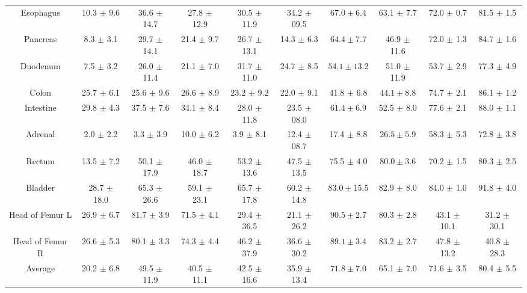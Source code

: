 \begin{table}[t!]
{\begin{subtable}{1\textwidth}
{\begin{tabular}{cccccccccc}
Esophagus&10.3 $\pm$ 9.6&36.6 $\pm$ 14.7&27.8 $\pm$ 12.9&30.5 $\pm$ 11.9&34.2 $\pm$ 09.5&$\bm{67.0\pm6.4}$&63.1 $\pm$ 7.7&72.0 $\pm$ 0.7&81.5 $\pm$ 1.5\\
Pancreas&8.3 $\pm$ 3.1&29.7 $\pm$ 14.1&21.4 $\pm$ 9.7&26.7 $\pm$ 13.1&14.3 $\pm$ 6.3&$\bm{64.4\pm7.7}$&46.9 $\pm$ 11.6&72.0 $\pm$ 1.3&84.7 $\pm$ 1.6\\
Duodenum&7.5 $\pm$ 3.2&26.0 $\pm$ 11.4&21.1 $\pm$ 7.0&31.7 $\pm$ 11.0&24.7 $\pm$ 8.5&$\bm{54.1\pm13.2}$&51.0 $\pm$ 11.9&53.7 $\pm$ 2.9&77.3 $\pm$ 4.9\\
Colon&25.7 $\pm$ 6.1&25.6 $\pm$ 9.6&26.6 $\pm$ 8.9&23.2 $\pm$ 9.2&22.0 $\pm$ 9.1&41.8 $\pm$ 6.8&$\bm{44.1\pm8.8}$&74.7 $\pm$ 2.1&86.1 $\pm$ 1.2\\
Intestine&29.8 $\pm$ 4.3&37.5 $\pm$ 7.6&34.1 $\pm$ 8.4&28.0 $\pm$ 11.8&23.5 $\pm$ 08.0&$\bm{61.4\pm6.9}$&52.5 $\pm$ 8.0&77.6 $\pm$ 2.1&88.0 $\pm$ 1.1\\
Adrenal&2.0 $\pm$ 2.2&3.3 $\pm$ 3.9&10.0 $\pm$ 6.2&3.9 $\pm$ 8.1&12.4 $\pm$ 08.7&17.4 $\pm$ 8.8&$\bm{26.5\pm5.9}$&58.3 $\pm$ 5.3&72.8 $\pm$ 3.8\\
Rectum&13.5 $\pm$ 7.2&50.1 $\pm$ 17.9&46.0 $\pm$ 18.7&53.2 $\pm$ 13.6&47.5 $\pm$ 13.5&75.5 $\pm$ 4.0&$\bm{80.0\pm3.6}$&70.2 $\pm$ 1.5&80.3 $\pm$ 2.5\\
Bladder&28.7 $\pm$ 18.0&65.3 $\pm$ 26.6&59.1 $\pm$ 23.1&65.7 $\pm$ 17.8&60.2 $\pm$ 14.8&$\bm{83.0\pm15.5}$&82.9 $\pm$ 8.0&84.0 $\pm$ 1.0&91.8 $\pm$ 4.0\\
Head of Femur L&26.9 $\pm$ 6.7&81.7 $\pm$ 3.9&71.5 $\pm$ 4.1&29.4 $\pm$ 36.5&21.1 $\pm$ 26.2&$\bm{90.5\pm2.7}$&80.3 $\pm$ 2.8&43.1 $\pm$ 10.1&31.2 $\pm$ 30.1\\
Head of Femur R&26.6 $\pm$ 5.3&80.1 $\pm$ 3.3&74.3 $\pm$ 4.4&46.2 $\pm$ 37.9&36.6 $\pm$ 30.2&$\bm{89.1\pm3.4}$&83.2 $\pm$ 2.7&47.8 $\pm$ 13.2&40.8 $\pm$ 28.3\\ \hline
Average&20.2 $\pm$ 6.8&49.5 $\pm$ 11.9&40.5 $\pm$ 11.1&42.5 $\pm$ 16.6&35.9 $\pm$ 13.4&$\bm{71.8\pm7.0}$&65.1 $\pm$ 7.0&71.6 $\pm$ 3.5&80.4 $\pm$ 5.5\\
    \bottomrule[1.5pt]
    \end{tabular}}
    \end{subtable}
    }
    \label{tab:7}
    \end{table}